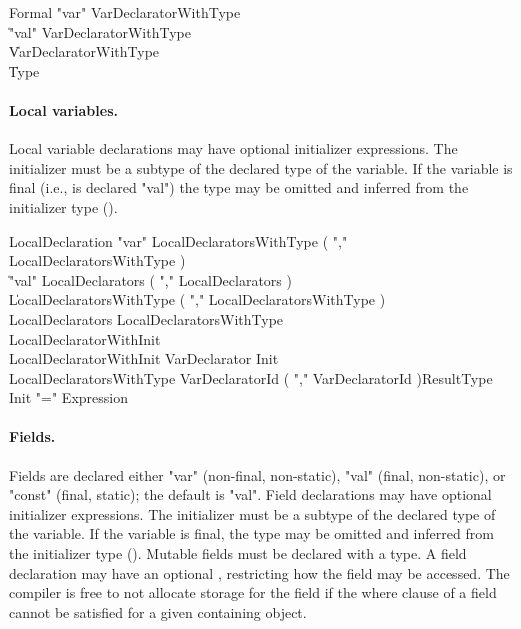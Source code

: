 \begin{grammar}
Formal
        \: \xcd"var" VarDeclaratorWithType \\
        \| \xcd"val" VarDeclaratorWithType \\
        \| VarDeclaratorWithType \\
        \| Type \\
\end{grammar}

\paragraph{Local variables.}
Local variable declarations may have optional
initializer expressions.  The initializer must be a subtype of
the declared type of the variable.  If the variable is final
(i.e., is declared \xcd"val")
the type may be omitted and
inferred from the initializer type ().

\begin{grammar}
LocalDeclaration
        \: \xcd"var" LocalDeclaratorsWithType ( \xcd"," LocalDeclaratorsWithType )\star \\
        \| \xcd"val" LocalDeclarators ( \xcd"," LocalDeclarators )\star \\
        \| LocalDeclaratorsWithType ( \xcd"," LocalDeclaratorsWithType )\star \\
LocalDeclarators
        \: LocalDeclaratorsWithType \\
        \: LocalDeclaratorWithInit \\
LocalDeclaratorWithInit
        \: VarDeclarator Init \\
LocalDeclaratorsWithType
        \: VarDeclaratorId
                ( \xcd"," VarDeclaratorId )\star ResultType \\
Init \: \xcd"=" Expression \\
\end{grammar}

\paragraph{Fields.}
Fields are declared either \xcd"var" (non-final, non-static),
\xcd"val" (final, non-static), or \xcd"const" (final, static);
the default is \xcd"val".
Field declarations may have optional
initializer expressions.  The initializer must be a subtype of
the declared type of the variable.  If the variable is final,
the type may be omitted and
inferred from the initializer type ().
Mutable fields must be declared with a type.
A field declaration may have an optional
, restricting how the field may be accessed.
The compiler is free to not allocate storage for the field if
the where clause of a field cannot be satisfied for a given containing
object.

